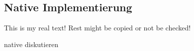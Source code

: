 \subsection{Native Implementierung} \label{subsection:evaluation-modifications-dynamic}
This is my real text! Rest might be copied or not be checked!


native diskutieren
